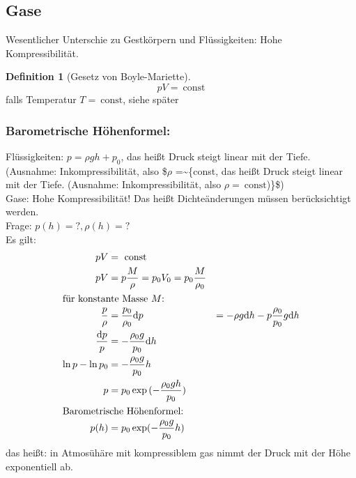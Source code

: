 \documentclass[a4paper]{scrartcl}
\renewcommand{\d}{\mathrm{d}}
\theoremstyle{definition}
\newtheorem{defn}{Definition}
\theoremstyle{plain}
\theoremstyle{plain}
\theoremstyle{remark}
\theoremstyle{remark}
\theoremstyle{remark}
\begin{document}
\subsection{Gase}
\label{sec-9-5}
Wesentlicher Unterschie zu Gestkörpern und Flüssigkeiten: Hohe Kompressibilität.
\begin{defn}[Gesetz von Boyle-Mariette]
\[p V = ~\text{const}\]
falls Temperatur $T = ~\text{const}$, siehe später
\end{defn}
\subsubsection{Barometrische Höhenformel:}
\label{sec-9-5-1}
Flüssigkeiten: $p = \rho g h + p_0$, das heißt Druck steigt linear mit der Tiefe. (Ausnahme: Inkompressibilität, also \$$\rho$ =\textasciitilde{}\text\{const, das heißt Druck steigt linear mit der Tiefe. (Ausnahme: Inkompressibilität, also $\rho =~\text{const}$)\}\$) \\
        Gase: Hohe Kompressibilität! Das heißt Dichteänderungen müssen berücksichtigt werden. \\
        Frage: $p(h) = ?, \rho(h) = ?$ \\
        Es gilt:
\begin{align*}
p V &=~\text{const} \\
p V &= p \frac{M}{\rho} = p_0 V_0 = p_0 \frac{M}{\rho_0} \\
\intertext{für konstante Masse $M$:}
\frac{p}{\rho} &= \frac{p_0}{\rho_0}
\d p &= -\rho g\d h - p \frac{\rho_0}{p_0} g\d h \\
\frac{\d p}{p} &= -\frac{\rho_0 g}{p_0} \d h \\
\ln{p} - \ln{p_0} &= -\frac{\rho_0 g}{p_0} h \\
p &= p_0 \exp{(-\frac{\rho_0 g h}{p_0})} \\
\intertext{Barometrische Höhenformel:}
p(h) &= p_0 \exp(-\frac{\rho_0 g}{p_0} h)
\end{align*}
das heißt: in Atmosühäre mit kompressiblem gas nimmt der Druck mit der Höhe exponentiell ab.
\end{document}
